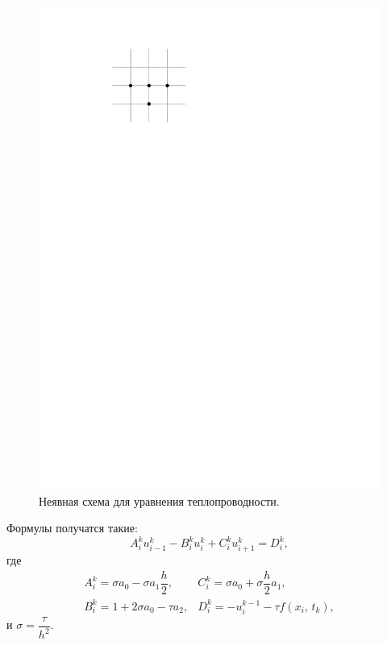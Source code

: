 \documentclass{trlnotes}
\begin{document}
    \begin{figure}[h] \label{fig:therm-implicit}
        \begin{center}
            \includegraphics[scale=0.9]{../img/pde/therm-implicit.pdf}
        \end{center}
        \caption{Неявная схема для уравнения теплопроводности.}
    \end{figure}

    Формулы получатся такие:
    \[
        A_i^k u_{i-1}^k - B_i^k u_i^k + C_i^k u_{i+1}^k = D_i^k,
    \]
    где
    \[
        \begin{array}{ll}
            A_i^k = \sigma a_0 - \sigma a_1 \dfrac{h}{2}, & C_i^k = \sigma a_0 + \sigma \dfrac{h}{2} a_1, \\
            B_i^k = 1 + 2 \sigma a_0 - \tau a_2,  &D_i^k = -u_i^{k-1} - \tau f(x_i, \, t_k),
        \end{array}
    \]
    и $\sigma = \dfrac{\tau}{h^2}$.
\end{document}
